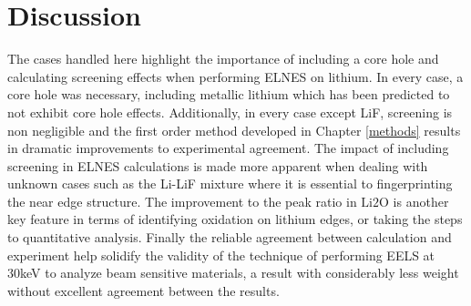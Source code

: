 \section{Discussion}
The cases handled here highlight the importance of including a core hole and calculating screening effects when performing ELNES on lithium.  In every case, a core hole was necessary, including metallic lithium which has been predicted to not exhibit core hole effects.  Additionally, in every case except LiF, screening is non negligible and the first order method developed in Chapter \ref{methods} results in dramatic improvements to experimental agreement.  The impact of including screening in ELNES calculations is made more apparent when dealing with unknown cases such as the Li-LiF mixture where it is essential to fingerprinting the near edge structure.  The improvement to the peak ratio in $ \mathrm{Li2O} $ is another key feature in terms of identifying oxidation on lithium edges, or taking the steps to quantitative analysis.  Finally the reliable agreement between calculation and experiment help solidify the validity of the technique of performing EELS at 30keV to analyze beam sensitive materials, a result with considerably less weight without excellent agreement between the results.  





